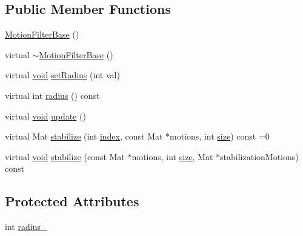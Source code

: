 \subsection*{Public Member Functions}
\begin{DoxyCompactItemize}
\item 
\hyperlink{classcv_1_1videostab_1_1MotionFilterBase_a0f9ca0ee3ae1de73f996887a5d221deb}{Motion\-Filter\-Base} ()
\item 
virtual \hyperlink{classcv_1_1videostab_1_1MotionFilterBase_aedd4d50e0905daab4e66ec55d28797ae}{$\sim$\-Motion\-Filter\-Base} ()
\item 
virtual \hyperlink{legacy_8hpp_a8bb47f092d473522721002c86c13b94e}{void} \hyperlink{classcv_1_1videostab_1_1MotionFilterBase_acac4889a8ba708e073c6ab7a6ad26250}{set\-Radius} (int val)
\item 
virtual int \hyperlink{classcv_1_1videostab_1_1MotionFilterBase_ad063a73ae8476143494b0dffbd81845f}{radius} () const 
\item 
virtual \hyperlink{legacy_8hpp_a8bb47f092d473522721002c86c13b94e}{void} \hyperlink{classcv_1_1videostab_1_1MotionFilterBase_a3d79ee83d55691988ec7be91e4828ad6}{update} ()
\item 
virtual Mat \hyperlink{classcv_1_1videostab_1_1MotionFilterBase_ac1e438a7905fafca7d94ce48ef6666dd}{stabilize} (int \hyperlink{core__c_8h_a750b5d744c39a06bfb13e6eb010e35d0}{index}, const Mat $\ast$motions, int \hyperlink{legacy_8hpp_ae97003f8d5c64cdfb99f6f2606d121b6}{size}) const =0
\item 
virtual \hyperlink{legacy_8hpp_a8bb47f092d473522721002c86c13b94e}{void} \hyperlink{classcv_1_1videostab_1_1MotionFilterBase_a1ef0354c34e8e25b2f5ddd8c80a10912}{stabilize} (const Mat $\ast$motions, int \hyperlink{legacy_8hpp_ae97003f8d5c64cdfb99f6f2606d121b6}{size}, Mat $\ast$stabilization\-Motions) const 
\end{DoxyCompactItemize}
\subsection*{Protected Attributes}
\begin{DoxyCompactItemize}
\item 
int \hyperlink{classcv_1_1videostab_1_1MotionFilterBase_a7e72f16acda126a8a01e1b734b826834}{radius\-\_\-}
\end{DoxyCompactItemize}


